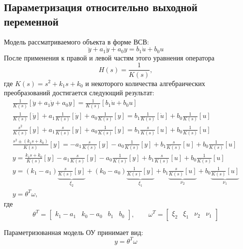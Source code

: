 \subsection{Параметризация относительно выходной переменной}
Модель рассматриваемого объекта в форме ВСВ:
\begin{equation}
    \ddot{y} + a_1 \dot{y} + a_0 y = b_1 \dot{u} + b_0 u
\end{equation}
После применения к правой и левой частям этого уравнения оператора
\begin{equation}
    H(s) = \frac{1}{K(s)},
\end{equation}
где $K(s) = s^2 + k_1 s + k_0$ и некоторого количества алгебраических преобразований достигается следующий результат:
\begin{gather}
    \frac{1}{K(s)}[\ddot{y} + a_1 \dot{y} + a_0 y] = \frac{1}{K(s)}[b_1 \dot{u} + b_0 u] \\
    \frac{1}{K(s)}[\ddot{y}] + a_1 \frac{1}{K(s)}[\dot{y}] + a_0\frac{1}{K(s)}[y] = b_1 \frac{1}{K(s)}[\dot{u}] + b_0\frac{1}{K(s)}[u] \\
    \frac{s^2}{K(s)}[y] + a_1 \frac{s}{K(s)}[y] + a_0\frac{1}{K(s)}[y] = b_1 \frac{s}{K(s)}[u] + b_0\frac{1}{K(s)}[u] \\
    \frac{s^2 \pm (k_1 s + k_0)}{K(s)}[y] = -a_1 \frac{s}{K(s)}[y] - a_0\frac{1}{K(s)}[y] + b_1 \frac{s}{K(s)}[u] + b_0\frac{1}{K(s)}[u] \\
    y = \frac{k_1 s + k_0}{K(s)}[y] -a_1 \frac{s}{K(s)}[y] - a_0\frac{1}{K(s)}[y] + b_1 \frac{s}{K(s)}[u] + b_0\frac{1}{K(s)}[u] \\
    y = (k_1 - a_1) \underbrace{\frac{s}{K(s)}[y]}_{\xi_2} + (k_0 - a_0) \underbrace{\frac{1}{K(s)}[y]}_{\xi_1} + b_1 \underbrace{\frac{s}{K(s)}[u]}_{\nu_2} + b_0 \underbrace{\frac{1}{K(s)}[u]}_{\nu_1} \\
    y = \theta^T \omega,
\end{gather}
где
\begin{equation}
    \theta^T =
    \begin{bmatrix}
        k_1 - a_1 & k_0 - a_0 & b_1 & b_0
    \end{bmatrix}\!\!,
    \qquad
    \omega^T =
    \begin{bmatrix}
        \xi_2 & \xi_1 & \nu_2 & \nu_1
    \end{bmatrix}
\end{equation}

Параметризованная модель ОУ принимает вид:
\begin{equation}
	y = \theta^T \omega
\end{equation}

